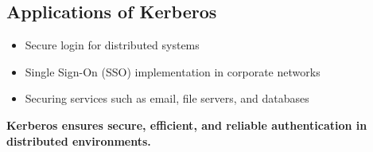 \documentclass[11pt]{article}
\begin{document}
\subsection{Applications of Kerberos}
\begin{itemize}
\item Secure login for distributed systems
\item Single Sign-On (SSO) implementation in corporate networks
\item Securing services such as email, file servers, and databases
\end{itemize}

\textbf{Kerberos ensures secure, efficient, and reliable authentication in distributed environments.}
\end{document}
